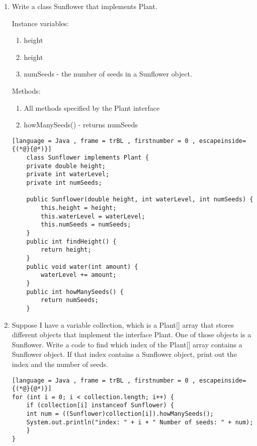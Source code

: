 \documentclass[letter]{article}
\begin{document}
\begin{enumerate} [1.]
\begin{lstlisting}[language = Java , frame = trBL , firstnumber = 0 , escapeinside={(*@}{@*)}]
        /* Changes the water level by amount
        @param An integer, the amount the water level changes */
        public void water(int amount);
    }
    \end{lstlisting}

    \item Write a class Sunflower that implements Plant. 
    
    Instance variables:
    \begin{enumerate}
        \item height
        \item height
        \item numSeeds - the number of seeds in a Sunflower object.
    \end{enumerate}
    
    Methods:
    \begin{enumerate}
        \item All methods specified by the Plant interface
        \item howManySeeds() - returns numSeeds
    \end{enumerate}

    \newpage

    \begin{lstlisting}[language = Java , frame = trBL , firstnumber = 0 , escapeinside={(*@}{@*)}]
    class Sunflower implements Plant {
    private double height;
    private int waterLevel;
    private int numSeeds;
    
    public Sunflower(double height, int waterLevel, int numSeeds) {
        this.height = height;
        this.waterLevel = waterLevel;
        this.numSeeds = numSeeds;
    }
    public int findHeight() {
        return height;
    }
    public void water(int amount) {
        waterLevel += amount;
    }
    public int howManySeeds() {
        return numSeeds;
    }
    \end{lstlisting}
    
    \item Suppose I have a variable collection, which is a Plant[] array that stores different objects that implement the interface Plant. One of those objects is a Sunflower. Write a code to find which index of the Plant[] array contains a Sunflower object. If that index contains a Sunflower object, print out the index and the number of seeds.

    \begin{lstlisting}[language = Java , frame = trBL , firstnumber = 0 , escapeinside={(*@}{@*)}]
for (int i = 0; i < collection.length; i++) {
    if (collection[i] instanceof Sunflower) {
	int num = ((Sunflower)collection[i]).howManySeeds();
	System.out.println("index: " + i + " Number of seeds: " + num);
    }
}
    \end{lstlisting}

    
\end{enumerate}
\end{document}
